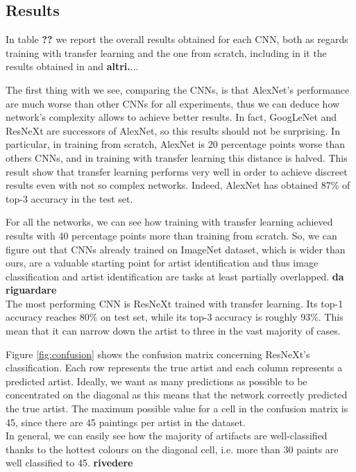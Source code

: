 \documentclass{article}
\begin{document}
\subsection{Results}\label{results}

In table \textbf{??} we report the overall results obtained for each CNN, both as regards training with transfer learning and the one from scratch, including in it the results obtained in \cite{ArtistIdCNN406} and \textbf{altri.}...

The first thing with we see, comparing the CNNs, is that AlexNet's performance are much worse than other CNNs for all experiments, thus we can deduce how network's complexity allows to achieve better results. In fact, GoogLeNet and ResNeXt are successors of AlexNet, so this results should not be surprising. 
In particular, in training from scratch, AlexNet is 20 percentage points worse than others CNNs, and in training with transfer learning this distance is halved. This result show that transfer learning performs very well in order to achieve discreet results even with not so complex networks. Indeed, AlexNet has obtained 87\% of top-3 accuracy in the test set.

For all the networks, we can see how training with transfer learning achieved results with 40 percentage points more than training from scratch. So, we can figure out that CNNs already trained on ImageNet dataset, which is wider than ours,  are a valuable starting point for artist identification and thus image classification and artist identification are tasks at least partially overlapped. \textbf{da riguardare}\\
The most performing CNN is ResNeXt trained with transfer learning. Its top-1 accuracy reaches 80\% on test set, while its top-3 accuracy is roughly 93\%. This mean that it can narrow down the artist to three in the vast majority of cases.

Figure \ref{fig:confusion} shows the confusion matrix concerning ResNeXt's classification. Each row represents the true artist and each column represents a predicted artist. Ideally, we want as many predictions as possible to be concentrated on the diagonal as this means that the network correctly predicted the true artist. The maximum possible value for a cell in the confusion matrix is 45, since there are 45 paintings per artist in the dataset.\\
In general, we can easily see how the majority of artifacts are well-classified thanks to the hottest colours on the diagonal cell, i.e. more than 30 paints are well classified to 45. \textbf{rivedere}
\end{document}

